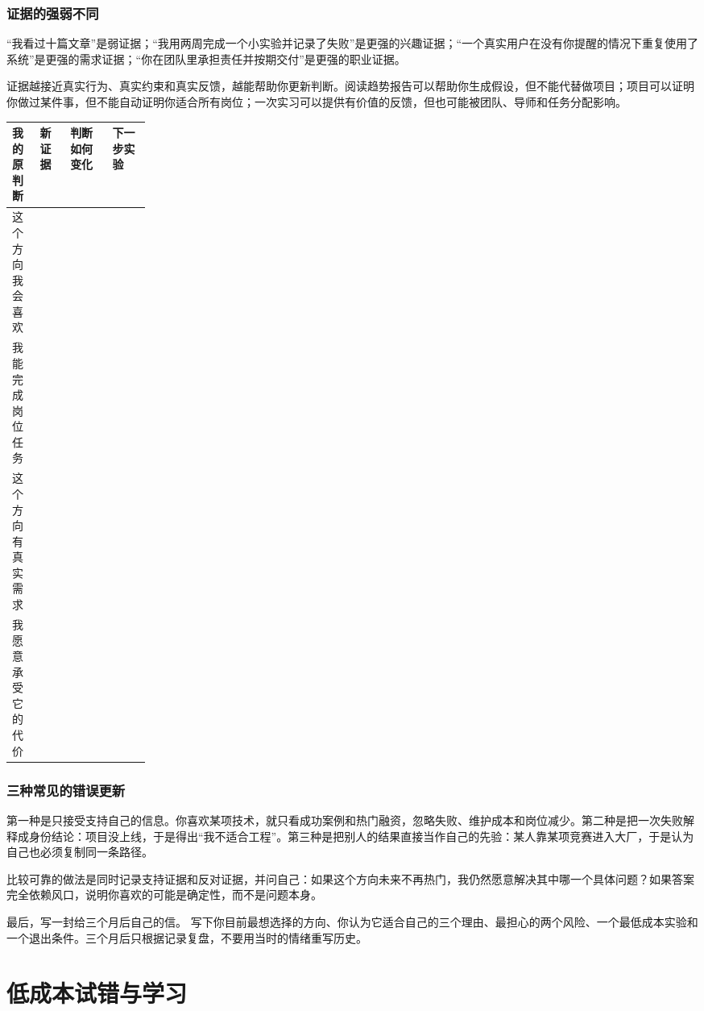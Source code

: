 \documentclass[UTF8,zihao=5,openany]{ctexbook}
\begin{document}
\subsection{证据的强弱不同}
“我看过十篇文章”是弱证据；“我用两周完成一个小实验并记录了失败”是更强的兴趣证据；“一个真实用户在没有你提醒的情况下重复使用了系统”是更强的需求证据；“你在团队里承担责任并按期交付”是更强的职业证据。

证据越接近真实行为、真实约束和真实反馈，越能帮助你更新判断。阅读趋势报告可以帮助你生成假设，但不能代替做项目；项目可以证明你做过某件事，但不能自动证明你适合所有岗位；一次实习可以提供有价值的反馈，但也可能被团队、导师和任务分配影响。

\begin{toolbox}
\begin{center}\small
\begin{tabularx}{0.92\linewidth}{p{0.20\linewidth}YYY}
\toprule
我的原判断 & 新证据 & 判断如何变化 & 下一步实验 \\
\midrule
这个方向我会喜欢 & & & \\
我能完成岗位任务 & & & \\
这个方向有真实需求 & & & \\
我愿意承受它的代价 & & & \\
\bottomrule
\end{tabularx}
\end{center}
\end{toolbox}

\subsection{三种常见的错误更新}
第一种是只接受支持自己的信息。你喜欢某项技术，就只看成功案例和热门融资，忽略失败、维护成本和岗位减少。第二种是把一次失败解释成身份结论：项目没上线，于是得出“我不适合工程”。第三种是把别人的结果直接当作自己的先验：某人靠某项竞赛进入大厂，于是认为自己也必须复制同一条路径。

比较可靠的做法是同时记录支持证据和反对证据，并问自己：如果这个方向未来不再热门，我仍然愿意解决其中哪一个具体问题？如果答案完全依赖风口，说明你喜欢的可能是确定性，而不是问题本身。

最后，写一封给三个月后自己的信。
写下你目前最想选择的方向、你认为它适合自己的三个理由、最担心的两个风险、一个最低成本实验和一个退出条件。三个月后只根据记录复盘，不要用当时的情绪重写历史。

\chapter{低成本试错与学习}
\end{document}
